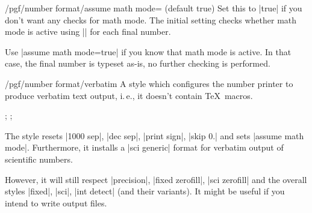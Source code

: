 \begin{key}{/pgf/number format/assume math mode= (default true)}
  Set this to |true| if you don't want any checks for math mode. The
  initial setting checks whether math mode is active using
  |\pgfutilensuremath| for each final number. 
	
  Use |assume math mode=true| if you know that math mode is active. In
  that case, the final number is typeset as-is, no further checking is
  performed. 
\end{key}


\begin{stylekey}{/pgf/number format/verbatim}
  A style which configures the number printer to produce verbatim text
  output, i.\,e., it doesn't contain \TeX\ macros. 
\begin{codeexample}[]
;
;
\pgfmathprintnumber{\pgfmathresult}
\end{codeexample}
  The style resets |1000 sep|, |dec sep|, |print sign|, |skip 0.| and
  sets |assume math mode|. Furthermore, it installs a |sci generic|
  format for verbatim output of scientific numbers. 

  However, it will still respect |precision|, |fixed zerofill|,
  |sci zerofill| and the overall styles |fixed|, |sci|, |int detect|
  (and their variants). It might be useful if you intend to write
  output files. 
\end{stylekey}
